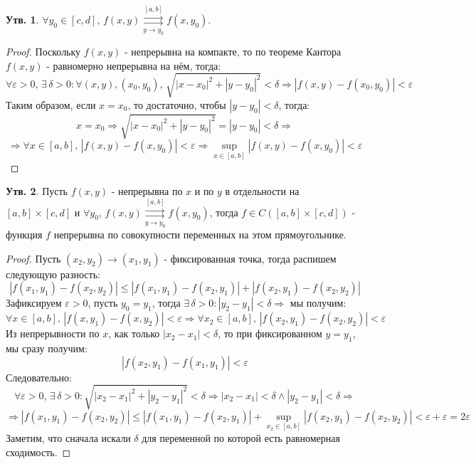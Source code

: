 \documentclass[12pt]{article}
\newcommand{\VE}{\varepsilon}
\theoremstyle{definition}
\newtheorem{prop}{Утв.}
\newcommand{\uconvm}[2]{\overset{#1}{\underset{#2}{\rightrightarrows}}}
\begin{document}
\begin{prop}
	$\forall y_0 \in [c,d], \, f(x,y) \uconvm{[a,b]}{y \to y_0} f(x,y_0)$.
\end{prop}
\begin{proof}
	Поскольку $f(x,y)$ - непрерывна на компакте, то по теореме Кантора $f(x,y)$ - равномерно непрерывна на нём, тогда:
	$$
		\forall \VE > 0, \, \exists \, \delta > 0 \colon \forall (x,y), (x_0, y_0),\, \sqrt{|x - x_0|^2 + |y - y_0|^2} < \delta \Rightarrow |f(x,y) - f(x_0,y_0)| < \VE
	$$
	Таким образом, если $x = x_0$, то достаточно, чтобы $|y - y_0| < \delta$, тогда:
	$$
		x = x_0 \Rightarrow \sqrt{|x - x_0|^2 + |y - y_0|^2} = |y - y_0| < \delta \Rightarrow 
	$$
	$$
		\Rightarrow \forall x \in [a,b], \, |f(x, y) - f(x, y_0)| < \VE \Rightarrow \sup\limits_{x \in [a,b]}|f(x,y) - f(x,y_0)| < \VE
	$$
\end{proof}
\begin{prop}
	Пусть $f(x,y)$ - непрерывна по $x$ и по $y$ в отдельности на $[a,b]\times [c,d]$ и $\forall y_0, \, f(x,y) \uconvm{[a,b]}{y \to y_0} f(x,y_0)$, тогда $f \in C([a,b] \times [c,d])$ - функция $f$ непрерывна по совокупности переменных на этом прямоугольнике.
\end{prop}
\begin{proof}
	Пусть $(x_2, y_2) \to (x_1, y_1)$ - фиксированная точка, тогда распишем следующую разность:
	$$
		|f(x_1, y_1) - f(x_2, y_2)| \leq |f(x_1,y_1) - f(x_2, y_1)| + |f(x_2, y_1) - f(x_2, y_2)|
	$$
	Зафиксируем $\VE > 0$, пусть $y_0 = y_1$, тогда $\exists \, \delta > 0 \colon |y_2 - y_1| < \delta \Rightarrow$ мы получим:
	$$
		\forall x \in [a,b], \, |f(x, y_1) - f(x, y_2)| < \VE\Rightarrow\forall x_2 \in [a,b], \, |f(x_2, y_1) - f(x_2, y_2)| < \VE
	$$ 
	Из непрерывности по $x$, как только $|x_2 - x_1| < \delta$, то при фиксированном $y = y_1$, мы сразу получим:
	$$
		|f(x_2,y_1) - f(x_1,y_1)| < \VE
	$$
	Следовательно:
	$$
		\forall \VE > 0, \, \exists \, \delta > 0 \colon \sqrt{|x_2 - x_1|^2 + |y_2 - y_1|^2} < \delta \Rightarrow |x_2 - x_1| < \delta \wedge |y_2 - y_1| < \delta \Rightarrow
	$$
	$$
		\Rightarrow |f(x_1, y_1) - f(x_2, y_2)| \leq |f(x_1,y_1) - f(x_2, y_1)| + \sup\limits_{x_2 \in [a,b]}|f(x_2, y_1) - f(x_2, y_2)| < \VE + \VE = 2 \VE
	$$
	Заметим, что сначала искали $\delta$ для переменной по которой есть равномерная сходимость.
\end{proof}
\end{document}
